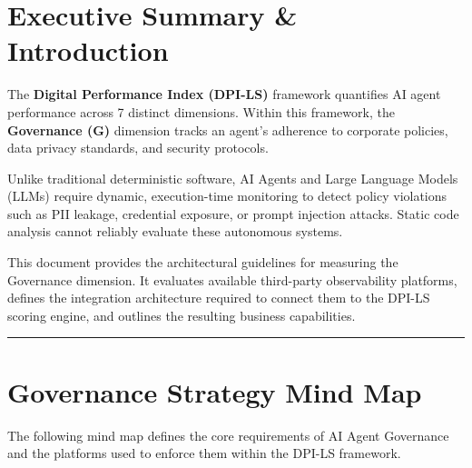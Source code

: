 \documentclass[11pt,a4paper]{article}
\begin{document}
\tableofcontents
\vspace{1cm}

\section{Executive Summary \& Introduction}

\begin{dpinote}
The \textbf{Digital Performance Index (DPI-LS)} framework quantifies AI agent performance across 7 distinct dimensions. Within this framework, the \textbf{Governance (G)} dimension tracks an agent's adherence to corporate policies, data privacy standards, and security protocols.
\end{dpinote}

Unlike traditional deterministic software, AI Agents and Large Language Models (LLMs) require dynamic, execution-time monitoring to detect policy violations such as PII leakage, credential exposure, or prompt injection attacks. Static code analysis cannot reliably evaluate these autonomous systems.

This document provides the architectural guidelines for measuring the Governance dimension. It evaluates available third-party observability platforms, defines the integration architecture required to connect them to the DPI-LS scoring engine, and outlines the resulting business capabilities.

\vspace{0.5cm}
\hrule
\vspace{0.5cm}

\section{Governance Strategy Mind Map}

The following mind map defines the core requirements of AI Agent Governance and the platforms used to enforce them within the DPI-LS framework.
\end{document}
